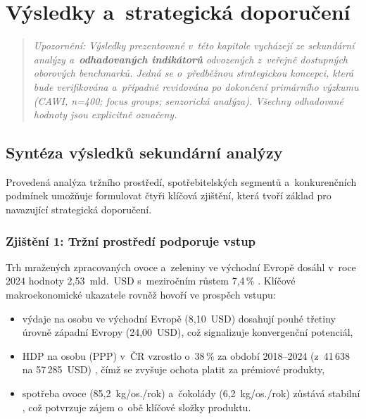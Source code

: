 \chapter{Výsledky a~strategická doporučení}
\label{chap:results}

\begin{quote}
\textit{Upozornění: Výsledky prezentované v~této kapitole vycházejí ze sekundární analýzy a~\textbf{odhadovaných indikátorů} odvozených z~veřejně dostupných oborových benchmarků. Jedná se o~předběžnou strategickou koncepci, která bude verifikována a~případně revidována po dokončení primárního výzkumu (CAWI, n=400; focus groups; senzorická analýza). Všechny odhadované hodnoty jsou explicitně označeny.}
\end{quote}

\section{Syntéza výsledků sekundární analýzy}
\label{sec:res_synthesis}

Provedená analýza tržního prostředí, spotřebitelských segmentů a~konkurenčních podmínek umožňuje formulovat čtyři klíčová zjištění, která tvoří základ pro navazující strategická doporučení.

\subsection{Zjištění 1: Tržní prostředí podporuje vstup}

Trh mražených zpracovaných ovoce a~zeleniny ve východní Evropě dosáhl v~roce 2024 hodnoty 2,53~mld.~USD s~meziročním růstem 7,4\,\% \parencite{frozenfoodeurope_2025}. Klíčové makroekonomické ukazatele rovněž hovoří ve prospěch vstupu:
\begin{itemize}
  \item výdaje na osobu ve východní Evropě (8,10~USD) dosahují pouhé třetiny úrovně západní Evropy (24,00~USD), což signalizuje konvergenční potenciál,
  \item HDP na osobu (PPP) v~ČR vzrostlo o~38\,\% za období 2018--2024 (z~41\,638 na 57\,285~USD) \parencite{worldbank_gdp_2026}, čímž se zvyšuje ochota platit za prémiové produkty,
  \item spotřeba ovoce (85,2~kg/os./rok) a~čokolády (6,2~kg/os./rok) zůstává stabilní \parencite{czso_spotreba_2024}, což potvrzuje zájem o~obě klíčové složky produktu.
\end{itemize}

